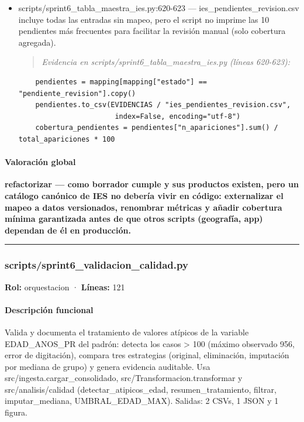 \begin{tcolorbox}[riesgo]
\begin{itemize}
  \item scripts/sprint6\_tabla\_maestra\_ies.py:620-623 --- ies\_pendientes\_revision.csv incluye todas las entradas sin mapeo, pero el script no imprime las 10 pendientes más frecuentes para facilitar la revisión manual (solo cobertura agregada).
\begin{quote}\footnotesize\ttfamily
\noindent\emph{Evidencia en scripts/sprint6\_tabla\_maestra\_ies.py (líneas 620-623):}
\end{quote}
\begin{lstlisting}
    pendientes = mapping[mapping["estado"] == "pendiente_revision"].copy()
    pendientes.to_csv(EVIDENCIAS / "ies_pendientes_revision.csv",
                       index=False, encoding="utf-8")
    cobertura_pendientes = pendientes["n_apariciones"].sum() / total_apariciones * 100
\end{lstlisting}

\end{itemize}
\end{tcolorbox}

\paragraph{Valoración global}
\textbf{refactorizar --- como borrador cumple y sus productos existen, pero un catálogo canónico de IES no debería vivir en código: externalizar el mapeo a datos versionados, renombrar métricas y añadir cobertura mínima garantizada antes de que otros scripts (geografía, app) dependan de él en producción.}

\medskip
\hrule

\subsubsection{scripts/sprint6\_validacion\_calidad.py}
\textbf{Rol:} orquestacion · \textbf{Líneas:} 121

\paragraph{Descripción funcional}
Valida y documenta el tratamiento de valores atípicos de la variable EDAD\_ANOS\_PR del padrón: detecta los casos > 100 (máximo observado 956, error de digitación), compara tres estrategias (original, eliminación, imputación por mediana de grupo) y genera evidencia auditable. Usa src/ingesta.cargar\_consolidado, src/Transformacion.transformar y src/analisis/calidad (detectar\_atipicos\_edad, resumen\_tratamiento, filtrar, imputar\_mediana, UMBRAL\_EDAD\_MAX). Salidas: 2 CSVs, 1 JSON y 1 figura.

